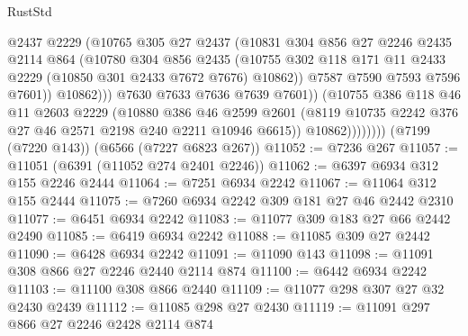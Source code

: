 \begin{lexlean}{RustStd}
\begin{coremodule}
                            @2437
                            @2229
                            (@10765
                              @305
                              @27
                              @2437
                              (@10831
                                @304
                                @856
                                @27
                                @2246
                                @2435
                                @2114
                                @864
                                (@10780
                                  @304
                                  @856
                                  @2435
                                  (@10755
                                    @302
                                    @118
                                    @171
                                    @11
                                    @2433
                                    @2229
                                    (@10850 @301 @2433 @7672 @7676)
                                    @10862))
                                @7587
                                @7590
                                @7593
                                @7596
                                @7601))
                            @10862)))
                      @7630
                      @7633
                      @7636
                      @7639
                      @7601))
                  (@10755
                    @386
                    @118
                    @46
                    @11
                    @2603
                    @2229
                    (@10880
                      @386
                      @46
                      @2599
                      @2601
                      (@8119 @10735 @2242 @376 @27 @46 @2571 @2198 @240 @2211 @10946 @6615))
                    @10862))))))))
    (@7199 (@7220 @143))
    (@6566 (@7227 @6823 @267))
@11052 := @7236 @267
@11057 := @11051 (@6391 (@11052 @274 @2401 @2246))
@11062 := @6397 @6934 @312 @155 @2246 @2444
@11064 := @7251 @6934 @2242
@11067 := @11064 @312 @155 @2444
@11075 := @7260 @6934 @2242 @309 @181 @27 @46 @2442 @2310
@11077 := @6451 @6934 @2242
@11083 := @11077 @309 @183 @27 @66 @2442 @2490
@11085 := @6419 @6934 @2242
@11088 := @11085 @309 @27 @2442
@11090 := @6428 @6934 @2242
@11091 := @11090 @143
@11098 := @11091 @308 @866 @27 @2246 @2440 @2114 @874
@11100 := @6442 @6934 @2242
@11103 := @11100 @308 @866 @2440
@11109 := @11077 @298 @307 @27 @32 @2430 @2439
@11112 := @11085 @298 @27 @2430
@11119 := @11091 @297 @866 @27 @2246 @2428 @2114 @874

\end{coremodule}
\end{lexlean}
